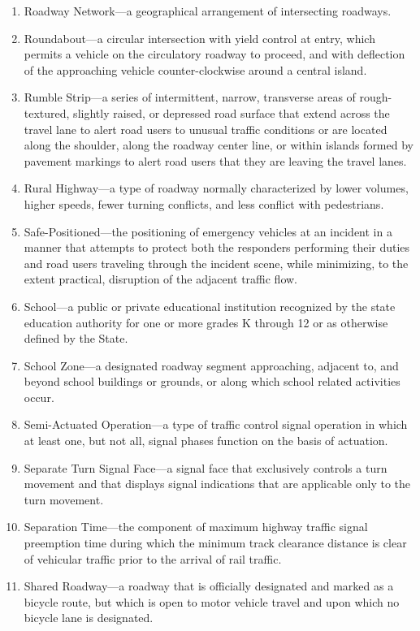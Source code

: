 \documentclass[9pt]{memoir}
\begin{document}
{\begin{enumerate}[label=\arabic*., ref=\arabic*]
\item Roadway Network---a geographical arrangement of intersecting roadways.
\item Roundabout---a circular intersection with yield control at entry, which permits a vehicle on the circulatory roadway to proceed, and with deflection of the approaching vehicle counter-clockwise around a central island.
\item Rumble Strip---a series of intermittent, narrow, transverse areas of rough-textured, slightly raised, or depressed road surface that extend across the travel lane to alert road users to unusual traffic conditions or are located along the shoulder, along the roadway center line, or within islands formed by pavement markings to alert road users that they are leaving the travel lanes.
\item Rural Highway---a type of roadway normally characterized by lower volumes, higher speeds, fewer turning conflicts, and less conflict with pedestrians.
\item Safe-Positioned---the positioning of emergency vehicles at an incident in a manner that attempts to protect both the responders performing their duties and road users traveling through the incident scene, while minimizing, to the extent practical, disruption of the adjacent traffic flow.
\item School---a public or private educational institution recognized by the state education authority for one or more grades K through 12 or as otherwise defined by the State.
\item School Zone---a designated roadway segment approaching, adjacent to, and beyond school buildings or grounds, or along which school related activities occur.
\item Semi-Actuated Operation---a type of traffic control signal operation in which at least one, but not all, signal phases function on the basis of actuation.
\item Separate Turn Signal Face---a signal face that exclusively controls a turn movement and that displays signal indications that are applicable only to the turn movement.
\item Separation Time---the component of maximum highway traffic signal preemption time during which the minimum track clearance distance is clear of vehicular traffic prior to the arrival of rail traffic.
\item Shared Roadway---a roadway that is officially designated and marked as a bicycle route, but which is open to motor vehicle travel and upon which no bicycle lane is designated.

\end{enumerate}}
\end{document}
